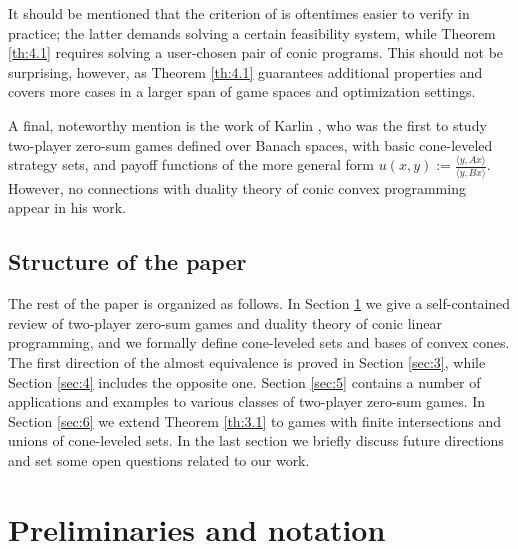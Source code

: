 \documentclass[11pt, twoside]{article}
\numberwithin{equation}{section}
\theoremstyle{definition}
\begin{document}
It should be mentioned that the criterion of \cite{ickstadt2024semidefinite} is oftentimes easier to verify in practice; the latter demands solving a certain feasibility system, while Theorem \ref{th:4.1} requires solving a user-chosen pair of conic programs. This should not be surprising, however, as Theorem \ref{th:4.1} guarantees additional properties and covers more cases in a larger span of game spaces and optimization settings.\par

A final, noteworthy mention is the work of Karlin \cite{karlin1953theory}, who was the first to study two-player zero-sum games defined over Banach spaces, with basic cone-leveled strategy sets, and payoff functions of the more general form $u(x,y):=\frac{\langle y,Ax\rangle}{\langle y,Bx\rangle}$. However, no connections with duality theory of conic convex programming appear in his work.

\vspace{-0.1cm}\subsection{Structure of the paper}\label{sec:1.3}\vspace{-0.2cm}

The rest of the paper is organized as follows. In Section \ref{sec:2} we give a self-contained review of two-player zero-sum games and duality theory of conic linear programming, and we formally define cone-leveled sets and bases of convex cones. The first direction of the almost equivalence is proved in Section \ref{sec:3}, while Section \ref{sec:4} includes the opposite one. Section \ref{sec:5} contains a number of applications and examples to various classes of two-player zero-sum games. In Section \ref{sec:6} we extend Theorem \ref{th:3.1} to games with finite intersections and unions of cone-leveled sets. In the last section we briefly discuss future directions and set some open questions related to our work.

\vspace{-0.1cm}\section{Preliminaries and notation}\label{sec:2}\vspace{-0.2cm}
\end{document}
